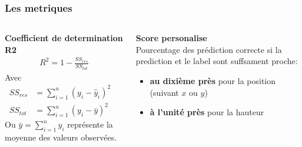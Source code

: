\begin{frame}
    \frametitle{Les metriques}
    \begin{columns}
        \begin{column}{0.5\textwidth}
            \textbf{Coefficient de determination R2}
        \begingroup
        \begin{align*}
            R^2 = 1 - \frac{SS_{res}}{SS_{tot}}
            \label{eqn:R2}
        \end{align*}
        Avec
        \scriptsize
        \begin{align*}
            SS_{res} &=  \sum_{i=1}^{n} \left( y_i - \hat{y}_i \right)^2 \quad \\
            SS_{tot} &=  \sum_{i=1}^{n} \left( y_i - \bar{y} \right)^2 
        \end{align*}
        Ou $ \bar{y} = \sum_{i=1}^{n} y_i $ représente la moyenne des valeurs observées.
        \endgroup
        \end{column}
        \begin{column}{0.5\textwidth}
        \textbf{Score personalise}\\
        Pourcentage des prédiction correcte si la prediction et le label sont suffsament proche:
        \begin{itemize}
         \item \textbf{au dixième près} pour la position (suivant $x$ ou $y$) 
         \item \textbf{à l'unité près} pour la hauteur 
        \end{itemize}

        \end{column}
    \end{columns}
\end{frame}



